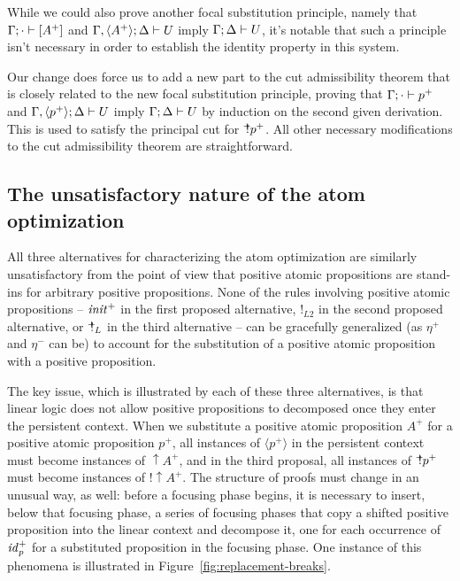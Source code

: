 While we could also prove another focal substitution principle,
namely that ${\Gamma};{\cdot} \vdash {[A^+]} \mathstrut$ and 
${\Gamma, \langle A^+ \rangle};{\Delta} \vdash {U} \mathstrut$ imply
${\Gamma};{\Delta} \vdash {U} \mathstrut$, it's notable that such a principle 
isn't necessary in order to establish the identity property in this
system. 

Our change does force us to add a new part to the cut admissibility
theorem that is closely related to the new focal substitution
principle, proving that ${\Gamma};{\cdot} \vdash {p^+} \mathstrut$ and
${\Gamma, \langle p^+ \rangle};{\Delta} \vdash {U} \mathstrut$ imply
${\Gamma};{\Delta} \vdash {U} \mathstrut$ by induction on the second given
derivation. This is used to satisfy the principal cut for
${\mbox{\hspace{2pt}$\mathbb !$\hspace{-5pt}$^+$\hspace{-1pt}}}p^+$. All other necessary modifications to the cut
admissibility theorem are straightforward.

\subsection{The unsatisfactory nature of the atom optimization}

All three alternatives for characterizing the atom optimization are
similarly unsatisfactory from the point of view that positive atomic
propositions are stand-ins for arbitrary positive propositions. None
of the rules involving positive atomic propositions -- ${\it init}^+$
in the first proposed alternative, ${!}_{L2}$ in the second proposed
alternative, or ${\mbox{\hspace{2pt}$\mathbb !$\hspace{-5pt}$^+$\hspace{-1pt}}}_L$ in the third alternative -- can be
gracefully generalized (as $\eta^+$ and $\eta^-$ can be) to account
for the substitution of a positive atomic proposition with a positive
proposition. 

The key issue, which is illustrated by each of these three
alternatives, is that linear logic does not allow positive
propositions to decomposed once they enter the persistent context.
When we substitute a positive atomic proposition $A^+$ for a positive
atomic proposition $p^+$, all instances of $\langle p^+
\rangle$ in the persistent context must become instances of
${\uparrow}A^+$, and in the third proposal, all instances of
${\mbox{\hspace{2pt}$\mathbb !$\hspace{-5pt}$^+$\hspace{-1pt}}}p^+$ must become instances of ${!}{\uparrow}A^+$. The structure
of proofs must change in an unusual way, as well: before a focusing
phase begins, it is necessary to insert, below that focusing phase,
a series of focusing phases that copy a shifted positive proposition
into the linear context and decompose it, one for each occurrence of
${\it id}^+_p$ for a substituted proposition in the focusing phase.
One instance of this phenomena 
is illustrated in Figure~\ref{fig:replacement-breaks}.


